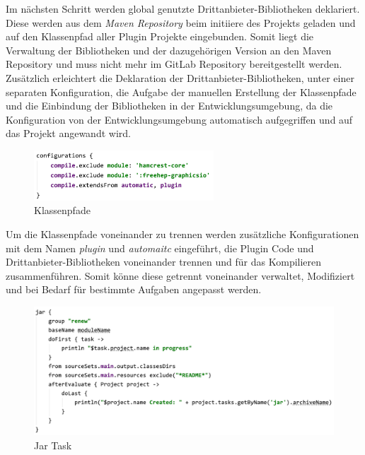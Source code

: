 	Im nächsten Schritt werden global genutzte Drittanbieter-Bibliotheken deklariert. Diese werden aus dem \textit{Maven Repository} beim initiiere des Projekts geladen und auf den Klassenpfad aller Plugin Projekte eingebunden. Somit liegt die Verwaltung der Bibliotheken und der dazugehörigen Version an den Maven Repository und muss nicht mehr im GitLab Repository bereitgestellt werden.\newline
 	Zusätzlich erleichtert die Deklaration der Drittanbieter-Bibliotheken, unter einer separaten Konfiguration, die Aufgabe der manuellen Erstellung der Klassenpfade und die Einbindung der Bibliotheken in der Entwicklungsumgebung, da die Konfiguration von der Entwicklungsumgebung automatisch aufgegriffen und auf das Projekt angewandt wird.\bigbreak

	\begin{figure}[h!]
	  \centering
	  \includegraphics[width=0.6\textwidth]{material/images/configurations.png}
	  \caption{Klassenpfade}
	  \label{fig:kPath}
	\end{figure}

 	Um die Klassenpfade voneinander zu trennen werden zusätzliche Konfigurationen mit dem Namen \textit{plugin} und \textit{automaitc} eingeführt, die Plugin Code und Drittanbieter-Bibliotheken voneinander trennen und für das Kompilieren zusammenführen. Somit könne diese getrennt voneinander verwaltet, Modifiziert und bei Bedarf für bestimmte Aufgaben angepasst werden.\bigbreak

	\begin{figure}[h!]
	  \centering
	  \includegraphics[width=\textwidth]{material/images/jar.png}
	  \caption{Jar Task}
	  \label{fig:jar}
	\end{figure}

